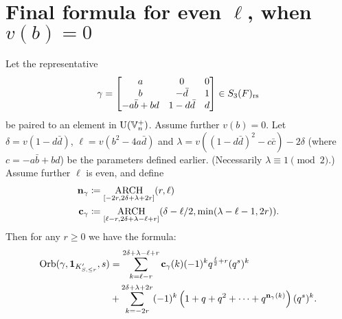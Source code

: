 
\section{Final formula for even $\ell$, when $v(b) = 0$}
\begin{theorem}
  Let the representative
  \[ \gamma = \begin{bmatrix}
      a & 0 & 0 \\
      b & - \bar d & 1 \\
      -a \bar b + b d & 1 - d \bar d & d
    \end{bmatrix} \in S_3(F)_{\mathrm{rs}} \]
  be paired to an element in $\operatorname{U}(\mathbb V_n^+)$.
  Assume further $v(b) = 0$.
  Let $\delta = v(1 - d \bar d)$, $\ell = v(b^2 - 4 a \bar d)$ and
  $\lambda = v((1 - d \bar d)^2 - c \bar c) - 2\delta$
  (where $c = -a \bar b + b d $) be the parameters defined earlier.
  (Necessarily $\lambda \equiv 1 \pmod 2$.)
  Assume further $\ell$ is even, and define
  \begin{align*}
    \mathbf n_\gamma &\coloneqq \operatorname*{ARCH}_{[-2r, 2\delta + \lambda + 2r]}(r, \ell) \\
    \mathbf c_\gamma &\coloneqq \operatorname*{ARCH}_{[\ell-r, 2\delta + \lambda - \ell + r]}
    (\delta - \ell/2, \min(\lambda-\ell-1, 2r)).
  \end{align*}
  Then for any $r \ge 0$ we have the formula:
  \begin{align*}
    \operatorname{Orb}(\gamma, \mathbf{1}_{K'_{S, \le r}}, s)
    &= \sum_{k = \ell-r}^{2\delta + \lambda - \ell + r} \mathbf c_\gamma(k) (-1)^k q^{\frac{\ell}{2}+r} (q^s)^k \\
    &+ \sum_{k = -2r}^{2\delta + \lambda + 2r}
    (-1)^k \left( 1 + q + q^2 + \dots + q^{\mathbf n_{\gamma}(k)}  \right) (q^s)^k.
  \end{align*}
\end{theorem}
